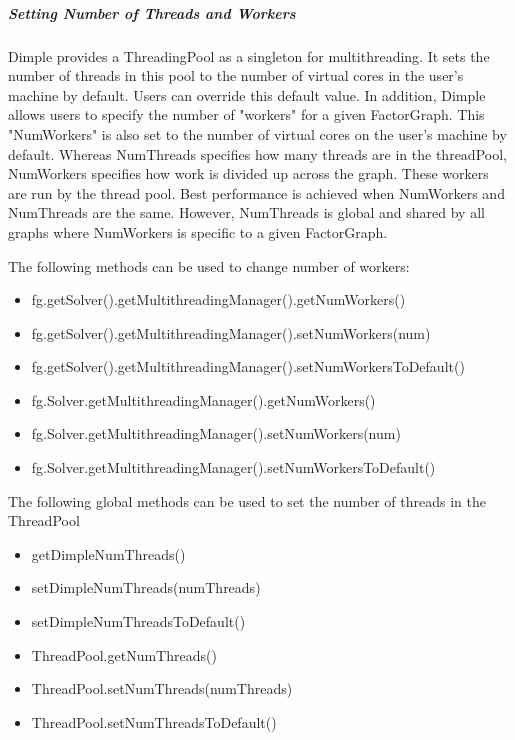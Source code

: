 \subparagraph{Setting Number of Threads and Workers}

Dimple provides a ThreadingPool as a singleton for multithreading.  It sets the number of threads in this pool to the number of virtual cores in the user's machine by default.  Users can override this default value.  In addition, Dimple allows users to specify the number of "workers" for a given FactorGraph.  This "NumWorkers" is also set to the number of virtual cores on the user's machine by default.  Whereas NumThreads specifies how many threads are in the threadPool, NumWorkers specifies how work is divided up across the graph.  These workers are run by the thread pool.  Best performance is achieved when NumWorkers and NumThreads are the same.  However, NumThreads is global and shared by all graphs where NumWorkers is specific to a given FactorGraph.

The following methods can be used to change number of workers:

\ifjava
\begin{itemize}
\item fg.getSolver().getMultithreadingManager().getNumWorkers()
\item fg.getSolver().getMultithreadingManager().setNumWorkers(num)
\item fg.getSolver().getMultithreadingManager().setNumWorkersToDefault()
\end{itemize}
\fi

\ifmatlab
\begin{itemize}
\item fg.Solver.getMultithreadingManager().getNumWorkers()
\item fg.Solver.getMultithreadingManager().setNumWorkers(num)
\item fg.Solver.getMultithreadingManager().setNumWorkersToDefault()
\end{itemize}
\fi

The following global methods can be used to set the number of threads in the ThreadPool

\ifmatlab
\begin{itemize}
\item getDimpleNumThreads()
\item setDimpleNumThreads(numThreads)
\item setDimpleNumThreadsToDefault()
\end{itemize}
\fi

\ifjava
\begin{itemize}
\item ThreadPool.getNumThreads()
\item ThreadPool.setNumThreads(numThreads)
\item ThreadPool.setNumThreadsToDefault()
\end{itemize}
\fi

